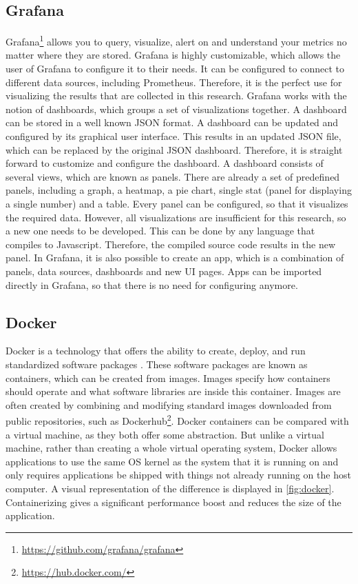 \subsection{Grafana}
Grafana\footnote{\url{https://github.com/grafana/grafana}} allows you to query, visualize, alert on and understand your metrics no matter where they are stored. Grafana is highly customizable, which allows the user of Grafana to configure it to their needs. It can be configured to connect to different data sources, including Prometheus. Therefore, it is the perfect use for visualizing the results that are collected in this research. Grafana works with the notion of dashboards, which groups a set of visualizations together. A dashboard can be stored in a well known JSON format. A dashboard can be updated and configured by its graphical user interface. This results in an updated JSON file, which can be replaced by the original JSON dashboard. Therefore, it is straight forward to customize and configure the dashboard. A dashboard consists of several views, which are known as panels. There are already a set of predefined panels, including a graph, a heatmap, a pie chart, single stat (panel for displaying a single number) and a table. Every panel can be configured, so that it visualizes the required data. However, all visualizations are insufficient for this research, so a new one needs to be developed. This can be done by any language that compiles to Javascript. Therefore, the compiled source code results in the new panel. In Grafana, it is also possible to create an app, which is a combination of panels, data sources, dashboards and new UI pages. Apps can be imported directly in Grafana, so that there is no need for configuring anymore. 

\subsection{Docker} \label{sec:docker}
Docker is a technology that offers the ability to create, deploy, and run standardized software packages \cite{docker}. These software packages are known as containers, which can be created from images. Images specify how containers should operate and what software libraries are inside this container. Images are often created by combining and modifying standard images downloaded from public repositories, such as Dockerhub\footnote{\url{https://hub.docker.com/}}. Docker containers can be compared with a virtual machine, as they both offer some abstraction. But unlike a virtual machine, rather than creating a whole virtual operating system, Docker allows applications to use the same OS kernel as the system that it is running on and only requires applications be shipped with things not already running on the host computer. A visual representation of the difference is displayed in \autoref{fig:docker}. Containerizing gives a significant performance boost and reduces the size of the application.

